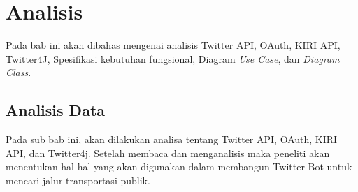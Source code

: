 \chapter{Analisis}
\label{chap:analisis}

Pada bab ini akan dibahas mengenai analisis Twitter API, OAuth, KIRI API, Twitter4J, Spesifikasi kebutuhan fungsional, Diagram \textit{Use Case}, dan \textit{Diagram Class}.

\section{Analisis Data}

Pada sub bab ini, akan dilakukan analisa tentang Twitter API, OAuth, KIRI API, dan Twitter4j. Setelah membaca dan menganalisis maka peneliti akan menentukan hal-hal  yang akan digunakan dalam membangun Twitter Bot untuk mencari jalur transportasi publik.

